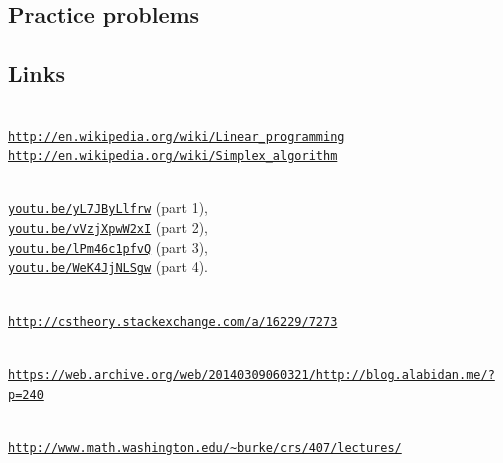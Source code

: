 \documentclass[11pt,oneside]{article}
\begin{document}
		
	\subsection{Practice problems}

		

		
	\subsection{Links}

		 \\
		\href{http://en.wikipedia.org/wiki/Linear_programming}{\texttt{http://en.wikipedia.org/wiki/Linear\_programming}} \\ 
		\href{http://en.wikipedia.org/wiki/Simplex_algorithm}{\texttt{http://en.wikipedia.org/wiki/Simplex\_algorithm}}

		\medskip
		 \\
		\href{https://youtu.be/yL7JByLlfrw} 
			{\texttt{youtu.be/yL7JByLlfrw}} (part 1), \\
		\href{https://youtu.be/vVzjXpwW2xI}
			{\texttt{youtu.be/vVzjXpwW2xI}} (part 2), \\
		\href{https://youtu.be/lPm46c1pfvQ}
			{\texttt{youtu.be/lPm46c1pfvQ}} (part 3),  \\
		\href{https://youtu.be/WeK4JjNLSgw}
			{\texttt{youtu.be/WeK4JjNLSgw}} (part 4).


		\medskip
		 \\
		\href{http://cstheory.stackexchange.com/a/16229/7273}
			{\texttt{http://cstheory.stackexchange.com/a/16229/7273}}

		\medskip
		 \\ 
		\href{https://web.archive.org/web/20140309060321/http://blog.alabidan.me/?p=240}
			{\texttt{https://web.archive.org/web/20140309060321/http://blog.alabidan.me/?p=240}}

		\medskip
		 \\
		\href{http://www.math.washington.edu/~burke/crs/407/lectures/}
	            {\texttt{http://www.math.washington.edu/\textasciitilde{}burke/crs/407/lectures/}}
\end{document}
